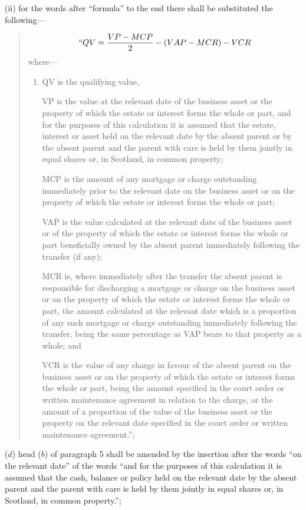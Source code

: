 \documentclass[12pt,a4paper]{article}
\begin{document}
\begin{enumerate}
\begin{enumerate}
(ii) for the words after “formula” to the end there shall be substituted the following—
\begin{quotation}
\[``QV = \frac{VP-MCP}{2} - (VAP-MCR) - VCR\]
where—
\begin{enumerate}\item[]
QV is the qualifying value,

VP is the value at the relevant date of the business asset or the property of which the estate or interest forms the whole or part,
and
for the purposes of this calculation it is assumed that the estate, interest or asset held on the relevant date by the absent parent or by the absent parent and the parent with care is held by them jointly in equal shares or, in Scotland, in common property;

MCP is the amount of any mortgage or charge outstanding immediately prior to the relevant date on the business asset or on the property of which the estate or interest forms the whole or part;

VAP is the value calculated at the relevant date of the business asset or of the property of which the estate or interest forms the whole or part beneficially owned by the absent parent immediately following the transfer (if any);

MCR is, where immediately after the transfer the absent parent is responsible for discharging a mortgage or charge on the business asset or on the property of which the estate or interest forms the whole or part, the amount calculated at the relevant date which is a proportion of any such mortgage or charge outstanding immediately following the transfer, being the same percentage as VAP bears to that property as a whole; and

VCR is the value of any charge in favour of the absent parent on the business asset or on the property of which the estate or interest forms the whole or part, being the amount specified in the court order or written maintenance agreement in relation to the charge, or the amount of a proportion of the value of the business asset or the property on the relevant date specified in the court order or written maintenance agreement.”;
\end{enumerate}
\end{quotation}
\end{enumerate}

($d$) head ($b$) of paragraph 5 shall be amended by the insertion after the words “on the relevant date” of the words “and for the purposes of this calculation it is assumed that the cash, balance or policy held on the relevant date by the absent parent and the parent with care is held by them jointly in equal shares or, in Scotland, in common property.”;


\end{enumerate}
\end{document}
